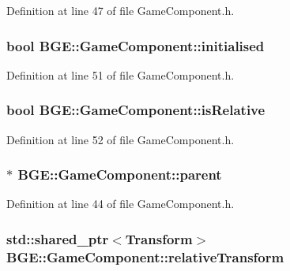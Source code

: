 Definition at line 47 of file Game\-Component.\-h.

\hypertarget{class_b_g_e_1_1_game_component_aeccb76e843b38bee0a6faa6e40eda1ff}{
\subsubsection[{initialised}]{\setlength{\rightskip}{0pt plus 5cm}bool B\-G\-E\-::\-Game\-Component\-::initialised}}\label{class_b_g_e_1_1_game_component_aeccb76e843b38bee0a6faa6e40eda1ff}


Definition at line 51 of file Game\-Component.\-h.

\hypertarget{class_b_g_e_1_1_game_component_aa26c64cf49e76e1536419ea3a0229958}{
\subsubsection[{is\-Relative}]{\setlength{\rightskip}{0pt plus 5cm}bool B\-G\-E\-::\-Game\-Component\-::is\-Relative}}\label{class_b_g_e_1_1_game_component_aa26c64cf49e76e1536419ea3a0229958}


Definition at line 52 of file Game\-Component.\-h.

\hypertarget{class_b_g_e_1_1_game_component_acdf201a241a0bc654b1306a627964903}{
\subsubsection[{parent}]{$\ast$ B\-G\-E\-::\-Game\-Component\-::parent}}\label{class_b_g_e_1_1_game_component_acdf201a241a0bc654b1306a627964903}


Definition at line 44 of file Game\-Component.\-h.

\hypertarget{class_b_g_e_1_1_game_component_a6520e03331270f7502f6506aee231ddb}{
\subsubsection[{relative\-Transform}]{\setlength{\rightskip}{0pt plus 5cm}std\-::shared\-\_\-ptr$<${\bf Transform}$>$ B\-G\-E\-::\-Game\-Component\-::relative\-Transform}}\label{class_b_g_e_1_1_game_component_a6520e03331270f7502f6506aee231ddb}


